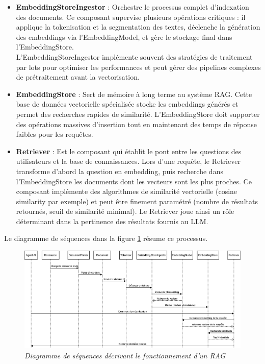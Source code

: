 \documentclass[12pt,a4paper]{report}
\begin{document}
\begin{itemize}
		\item \textbf{EmbeddingStoreIngestor} : Orchestre le processus complet d'indexation des documents. Ce composant supervise plusieurs opérations critiques : il applique la tokenisation et la segmentation des textes, déclenche la génération des embeddings via l'EmbeddingModel, et gère le stockage final dans l'EmbeddingStore. \\ L'EmbeddingStoreIngestor implémente souvent des stratégies de traitement par lots pour optimiser les performances et peut gérer des pipelines complexes de prétraitement avant la vectorisation.
		
		\item \textbf{EmbeddingStore} : Sert de mémoire à long terme au système RAG. Cette base de données vectorielle spécialisée stocke les embeddings générés et permet des recherches rapides de similarité. L'EmbeddingStore doit supporter des opérations massives d'insertion tout en maintenant des temps de réponse faibles pour les requêtes.
		
		\item \textbf{Retriever} : Est le composant qui établit le pont entre les questions des utilisateurs et la base de connaissances. Lors d'une requête, le Retriever transforme d'abord la question en embedding, puis recherche dans l'EmbeddingStore les documents dont les vecteurs sont les plus proches. Ce composant implémente des algorithmes de similarité vectorielle (cosine similarity par exemple) et peut être finement paramétré (nombre de résultats retournés, seuil de similarité minimal). Le Retriever joue ainsi un rôle déterminant dans la pertinence des résultats fournis au LLM.
		
	\end{itemize}
	
	Le diagramme de séquences dans la figure \ref{fig:ds-rag.drawio} résume ce processus.
	
	\begin{figure}[H]
		\centering
		\includegraphics[width=\textwidth]{ds-rag.drawio.png}
		\caption{\textit{Diagramme de séquences décrivant le fonctionnement d'un RAG}}
		\label{fig:ds-rag.drawio}
	\end{figure}
	
\end{document}
